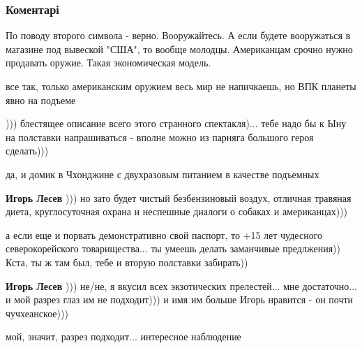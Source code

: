  
 
 
 
 
\subsubsection{Коментарі}

\begin{itemize} %
По поводу второго символа - верно. Вооружайтесь. А если будете вооружаться в магазине под вывеской "США", то вообще молодцы.
Американцам срочно нужно продавать оружие. Такая экономическая модель.

все так, только американским оружием весь мир не напичкаешь, но ВПК планеты явно на подъеме


))) блестящее описание всего этого странного спектакля)... тебе надо бы к Ыну на полставки напрашиваться - вполне можно из парняга большого героя сделать)))

\begin{itemize} %
да, и домик в Чхонджине с двухразовым питанием в качестве подъемных


\textbf{Игорь Лесев} ))) но зато будет чистый безбензиновый воздух, отличная травяная диета, круглосуточная охрана и неспешные диалоги о собаках и американцах)))


а если еще и порвать демонстративно свой паспорт, то +15 лет чудесного
северокорейского товарищества... ты умеешь делать заманчивые предлжения)) Кста,
ты ж там был, тебе и вторую полставки забирать))


\textbf{Игорь Лесев} ))) не/не, я вкусил всех экзотических прелестей... мне достаточно... и мой разрез глаз им не подходит))) и имя им больше Игорь нравится - он почти чучхеанское)))

мой, значит, разрез подходит... интересное наблюдение



\end{itemize}
\end{itemize}
